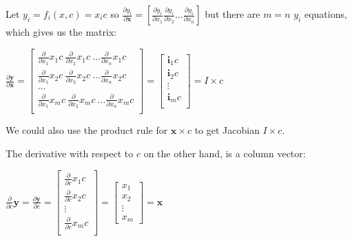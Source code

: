 \documentclass[11pt]{article}
\begin{document}
Let $y_i = f_i(x,c) = x_i c$ so $\frac{\partial y_i}{\partial {\mathbf{x}}} = [ \frac{\partial y_i}{\partial x_1} \frac{\partial y_i}{\partial x_2} \ldots \frac{\partial y_i}{\partial x_n} ]$ but there are $m=n$ $y_i$ equations,  which gives us the matrix:

$\frac{\partial \mathbf{y}}{\partial \mathbf{x}} =  \begin{bmatrix}
\frac{\partial}{\partial {x_1}} x_1 c~ \frac{\partial}{\partial {x_2}} x_1 c~ \ldots \frac{\partial}{\partial {x_n}} x_1 c \\
\frac{\partial}{\partial {x_1}} x_2 c~\frac{\partial}{\partial {x_2}} x_2 c~ \ldots \frac{\partial}{\partial {x_n}} x_2 c \\
\ldots\\
\frac{\partial}{\partial {x_1}} x_m c~ \frac{\partial}{\partial {x_2}} x_m c~ \ldots \frac{\partial}{\partial {x_n}} x_m c\\
\end{bmatrix} = \begin{bmatrix}
           \mathbf{i}_1 c\\
           \mathbf{i}_2 c\\
           \vdots \\
           \mathbf{i}_m c\\
           \end{bmatrix} = I \times c$

We could also use the product rule for $\mathbf{x} \times c$ to get Jacobian $I \times c$.
 
The derivative with respect to $c$ on the other hand, is a column vector:

$\frac{\partial}{\partial c} \mathbf{y} = \frac{\partial \mathbf{y}}{\partial c} = \begin{bmatrix}
           \frac{\partial}{\partial c} x_{1} c \\
           \frac{\partial}{\partial c} x_{2} c \\
           \vdots \\
           \frac{\partial}{\partial c} x_{m} c \\
         \end{bmatrix} = \begin{bmatrix}
           x_{1} \\
           x_{2} \\
           \vdots \\
           x_{m} 
         \end{bmatrix} = \mathbf{x}$
\end{document}

